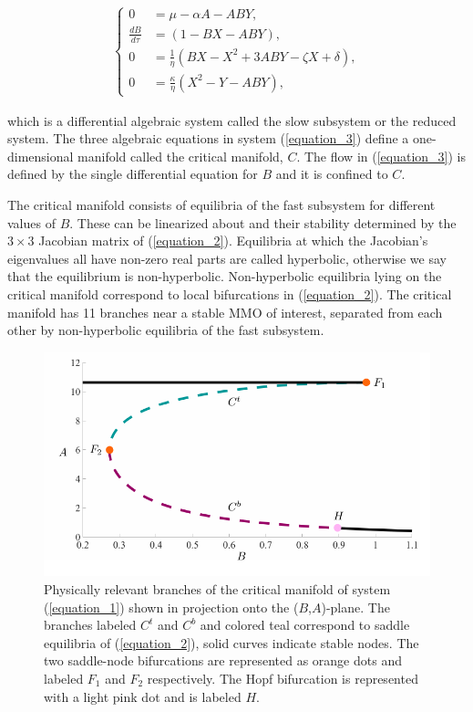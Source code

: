 \documentclass{ws-ijbc}
\begin{document}
 \begin{equation}
\begin{aligned}
\begin{cases}
0 &= \mu - \alpha A - ABY, \\
\frac{dB}{d\tau} &= (1-BX - ABY), \\
0 &= \frac{1}{\eta}(BX - X^2 +3ABY - \zeta X + \delta), \\
0 &= \frac{\kappa}{\eta}(X^2 - Y - ABY),
\end{cases}
\end{aligned}
\label{equation_3}
\end{equation}
    
\noindent
which is a differential algebraic system called the slow subsystem or the reduced system. The three algebraic equations in system (\ref{equation_3}) define a one-dimensional manifold called the critical manifold, $C$.  The flow in (\ref{equation_3}) is defined by the single differential equation for $B$ and it is confined to $C$.  

The critical manifold consists of equilibria of the fast subsystem for different values of $B$. These can be linearized about and their stability determined by the $3\times3$ Jacobian matrix of (\ref{equation_2}).  Equilibria at which the Jacobian's eigenvalues all have non-zero real parts are called hyperbolic, otherwise we say that the equilibrium is non-hyperbolic.  Non-hyperbolic equilibria lying on the critical manifold correspond to local bifurcations in (\ref{equation_2}).  The critical manifold has 11 branches near a stable MMO of interest, separated from each other by non-hyperbolic equilibria of the fast subsystem.

\begin{figure}[!t]
\begin{center}
\includegraphics[page=1]{figures.pdf}
\end{center}
\caption{Physically relevant branches of the critical manifold of system (\ref{equation_1}) shown in projection onto the ($B$,$A$)-plane.  The branches labeled $C^t$ and $C^b$ and colored teal correspond to saddle equilibria of (\ref{equation_2}), solid curves indicate stable nodes.  The two saddle-node bifurcations are represented as orange dots and labeled $F_1$ and $F_2$ respectively.  The Hopf bifurcation is represented with a light pink dot and is labeled $H$.}
\label{critical_figure}
\end{figure}
\end{document}
